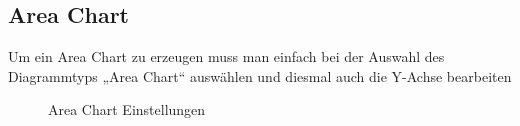 \subsection{Area Chart}
Um ein Area Chart zu erzeugen muss man einfach bei der Auswahl des Diagrammtyps „Area Chart“ auswählen und diesmal auch die Y-Achse bearbeiten
\begin{figure}[H]
\caption{Area Chart Einstellungen}
\end{figure}

